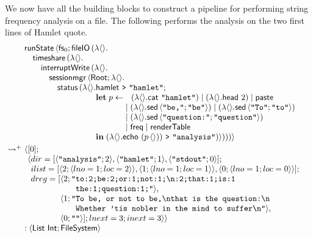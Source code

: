 \documentclass[12pt,phd,lfcs,twoside,openright,logo,leftchapter,normalheadings]{infthesis}
\theoremstyle{plain}
\theoremstyle{definition}
\begin{document}
We now have all the building blocks to construct a pipeline for
performing string frequency analysis on a file. The following performs
the analysis on the two first lines of Hamlet quote.
%
\[
  \ba{@{~}l@{~}l}
    &\bl
    \runState\,\Record{\dec{fs}_0;\fileIO\,(\lambda\Unit.\\
         \quad\timeshare\,(\lambda\Unit.\\
         \qquad\dec{interruptWrite}\,(\lambda\Unit.\\
         \qquad\quad\sessionmgr\,\Record{\Root;\lambda\Unit.\\
         \qquad\qquad\status\,(\lambda\Unit.
                  \ba[t]{@{}l}
                  \quoteHamlet~\redirect~\strlit{hamlet};\\
                  \Let\;p \revto
                  \bl
                    ~~(\lambda\Unit.\cat~\strlit{hamlet}) \mid (\lambda\Unit.\head~2) \mid \paste\\
                    \mid (\lambda\Unit.\sed\,\Record{\strlit{be,};\strlit{be}}) \mid (\lambda\Unit.\sed\,\Record{\strlit{To};\strlit{to}})\\
                    \mid (\lambda\Unit.\sed\,\Record{\strlit{question:};\strlit{question}})\\
                    \mid \freq \mid \printTable
                  \el\\
                  \In\;(\lambda\Unit.\echo~(p\,\Unit))~\redirect~\strlit{analysis})})))}
                 \ea
     \el \smallskip\\
     \reducesto^+&
     \bl
      \Record{
       \ba[t]{@{}l}
       [0];\\
       \Record{
         \ba[t]{@{}l}
           dir=[\Record{\strlit{analysis};2},\Record{\strlit{hamlet};1},
                \Record{\strlit{stdout};0}];\\
           ilist=[\Record{2;\Record{lno=1;loc=2}},
                  \Record{1;\Record{lno=1;loc=1}},
                  \Record{0;\Record{lno=1;loc=0}}];\\
           dreg=[
             \ba[t]{@{}l}
               \Record{2;
                 \ba[t]{@{}l@{}l}
                   \texttt{"}&\texttt{to:2;be:2;or:1;not:1;\nl:2;that:1;is:1}\\
                             &\texttt{the:1;question:1;"}},
                 \ea\\
               \Record{1;
                 \ba[t]{@{}l@{}l}
                   \texttt{"}&\texttt{To be, or not to be,\nl{}that is the question:\nl{}}\\
                             &\texttt{Whether 'tis nobler in the mind to suffer\nl{}"}},
                 \ea\\
                 \Record{0; \strlit{}}]; lnext=3; inext=3}}\\
           \ea
         \ea
       \ea\\
       : \Record{\List~\Int; \FileSystem}
     \el
  \ea
\]
\end{document}
